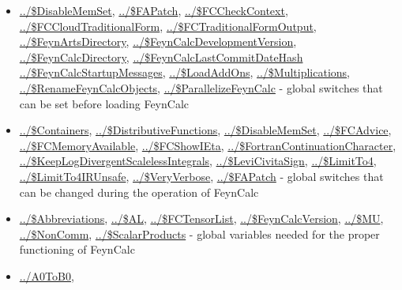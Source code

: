 \documentclass[../FeynCalcManual.tex]{subfiles}
\begin{document}
\begin{itemize}
\tightlist
\item
  \hyperlink{../dollardisablememset}{../\$DisableMemSet},
  \hyperlink{../dollarfapatch}{../\$FAPatch},
  \hyperlink{../dollarfccheckcontext}{../\$FCCheckContext},
  \hyperlink{../dollarfccloudtraditionalform}{../\$FCCloudTraditionalForm},
  \hyperlink{../dollarfctraditionalformoutput}{../\$FCTraditionalFormOutput},
  \hyperlink{../dollarfeynartsdirectory}{../\$FeynArtsDirectory},
  \hyperlink{../dollarfeyncalcdevelopmentversion}{../\$FeynCalcDevelopmentVersion},
  \hyperlink{../dollarfeyncalcdirectory}{../\$FeynCalcDirectory},
  \hyperlink{../dollarfeyncalclastcommitdatehash}{../\$FeynCalcLastCommitDateHash}
  \hyperlink{../dollarfeyncalcstartupmessages}{../\$FeynCalcStartupMessages},
  \hyperlink{../dollarloadaddons}{../\$LoadAddOns},
  \hyperlink{../dollarmultiplications}{../\$Multiplications},
  \hyperlink{../dollarrenamefeyncalcobjects}{../\$RenameFeynCalcObjects},
  \hyperlink{../dollarparallelizefeyncalc}{../\$ParallelizeFeynCalc} -
  global switches that can be set before loading FeynCalc
\item
  \hyperlink{../dollarcontainers}{../\$Containers},
  \hyperlink{../dollardistributivefunctions}{../\$DistributiveFunctions},
  \hyperlink{../dollardisablememset}{../\$DisableMemSet},
  \hyperlink{../dollarfcadvice}{../\$FCAdvice},
  \hyperlink{../dollarfcmemoryavailable}{../\$FCMemoryAvailable},
  \hyperlink{../dollarfcshowieta}{../\$FCShowIEta},
  \hyperlink{../dollarfortrancontinuationcharacter}{../\$FortranContinuationCharacter},
  \hyperlink{../dollarkeeplogdivergentscalelessintegrals}{../\$KeepLogDivergentScalelessIntegrals},
  \hyperlink{../dollarlevicivitasign}{../\$LeviCivitaSign},
  \hyperlink{../dollarlimitto4}{../\$LimitTo4},
  \hyperlink{../dollarlimitto4irunsafe}{../\$LimitTo4IRUnsafe},
  \hyperlink{../dollarveryverbose}{../\$VeryVerbose},
  \hyperlink{../dollarfapatch}{../\$FAPatch} - global switches that can
  be changed during the operation of FeynCalc
\item
  \hyperlink{../dollarabbreviations}{../\$Abbreviations},
  \hyperlink{../dollaral}{../\$AL},
  \hyperlink{../dollarfctensorlist}{../\$FCTensorList},
  \hyperlink{../dollarfeyncalcversion}{../\$FeynCalcVersion},
  \hyperlink{../dollarmu}{../\$MU},
  \hyperlink{../dollarnoncomm}{../\$NonComm},
  \hyperlink{../dollarscalarproducts}{../\$ScalarProducts} - global
  variables needed for the proper functioning of FeynCalc
\item
  \hyperlink{../a0tob0}{../A0ToB0},

\end{itemize}
\end{document}
